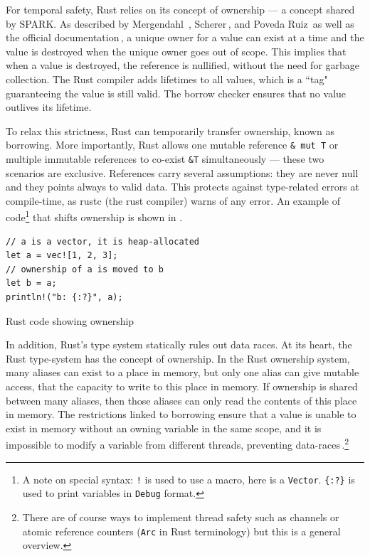 \documentclass[nomenclature, english, bibtex]{kththesis}
\newcommand{\inlinecode}[1]{\texttt{#1}}
\begin{document}
For temporal safety, Rust relies on its concept of ownership --- a concept shared by SPARK. As described by Mergendahl \etal\,\cite{mergendahl_cross-language_2022}, Scherer\,\cite{scherer_engineering_2021}, and Poveda Ruiz\,\cite{poveda_ruiz_bounded_2019} as well as the official documentation\,\cite{noauthor_rust_nodate}, a unique owner for a value can exist at a time and the value is destroyed when the unique owner goes out of scope.  This implies that when a value is destroyed, the reference is nullified, without the need for garbage collection. The Rust compiler adds lifetimes to all values, which is a ``tag" guaranteeing the value is still valid. The borrow checker ensures that no value outlives its lifetime.
 
To relax this strictness, Rust can temporarily transfer ownership, known as borrowing. More importantly, Rust allows one mutable reference \inlinecode{\& mut T} or multiple immutable references to co-exist \inlinecode{\&T} simultaneously --- these two scenarios are exclusive. References carry several assumptions: \first they are never null and \Second they points always to valid data. 
This  protects against type-related errors at compile-time, as rustc (the rust compiler) warns of any error. An example of code\footnote{A note on special syntax: \texttt{!} is used to use a macro, here is a \texttt{Vector}. \texttt{\{:?\}} is used to print variables in \texttt{Debug} format.} that shifts ownership is shown in .
 
\begin{listing}[!ht]
\begin{verbatim}
// a is a vector, it is heap-allocated
let a = vec![1, 2, 3]; 
// ownership of a is moved to b
let b = a;             
println!("b: {:?}", a);
\end{verbatim}
\caption[Rust code showing ownership]{Rust code showing ownership}
\label{lst:rust_ownership}
\end{listing}

In addition, Rust's type system statically rules out data races. At its heart, the Rust type-system has the concept of ownership. In the Rust ownership system, many aliases can exist to a place in memory, but only one alias can give mutable access, that the capacity to write to this place in memory. If ownership is shared between many aliases, then those aliases can only read the contents of this place in memory. The restrictions linked to borrowing ensure that a value is unable to exist in memory without an owning variable in the same scope, and it is impossible to modify a variable from different threads, preventing data-races\,\cite{poveda_ruiz_bounded_2019,noauthor_rust_nodate}.\footnote{There are of course ways to implement thread safety such as channels or atomic reference counters (\texttt{Arc} in Rust terminology) but this is a general overview.}
\end{document}
